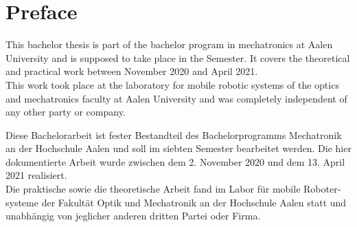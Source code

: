\chapter*{Preface}
\label{preface}

This bachelor thesis is part of the bachelor program in mechatronics at Aalen University and is supposed to take place in the  Semester. It covers the theoretical and practical work between November  2020 and April  2021.\\

This work took place at the laboratory for mobile robotic systems of the optics and mechatronics faculty at Aalen University and was completely independent of any other party or company.

\vspace*{25mm}

\begin{otherlanguage}{ngerman}
Diese Bachelorarbeit ist fester Bestandteil des Bachelorprogramms Mechatronik an der Hochschule Aalen und soll im siebten Semester bearbeitet werden. Die hier dokumentierte Arbeit wurde zwischen dem 2. November 2020 und dem 13. April 2021 realisiert.\\

Die praktische sowie die theoretische Arbeit fand im Labor für mobile Robotersysteme der Fakultät Optik und Mechatronik an der Hochschule Aalen statt und unabhängig von jeglicher anderen dritten Partei oder Firma.
\end{otherlanguage}
